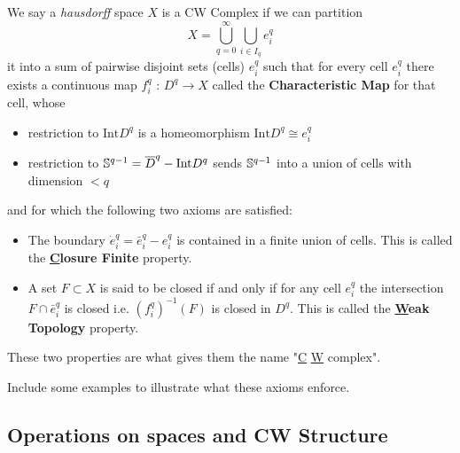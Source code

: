 \documentclass[11pt]{article}
\begin{document}
\begin{bluebox}
  
\begin{definition}
  We say a \textit{hausdorff} space $X$ is a CW Complex if we can partition $$ X = \bigcup_{q = 0}^{\infty} \bigcup_{i \in {I_q}} e_i^q $$ it into a sum of pairwise disjoint sets (cells) $e_i^q$ such that for every cell $e_i^q$ there exists a continuous map $f_i^q \text{ : } D^q \rightarrow X$ called the \textbf{Characteristic Map} for that cell, whose 
  \begin{itemize}
    \item restriction to $\mathrm{Int} D^q$ is a homeomorphism $\mathrm{Int} D^q \cong e_i^q$
    \item restriction to $\mathbb{S}^{q-1} = \overline{D}^q - \mathrm{Int} D^q$ sends $\mathbb{S}^{q-1}$ into a union of cells with dimension $< q$ 
  \end{itemize}
  and for which the following two axioms are satisfied: 
  \begin{itemize}
    \item The boundary $\dot{e}_i^q = \bar{e}_i^q - e_i^q$ is contained in a finite union of cells. This is called the \textbf{\underline{C}losure Finite} property.
    \item A set $F \subset X$ is said to be closed if and only if for any cell $e_i^q$ the intersection $F \cap \bar{e}_i^q$ is closed i.e. $\left(f_i^q\right)^{-1}(F)$ is closed in $D^q$. This is called the \textbf{\underline{W}eak Topology} property.
  \end{itemize}
\end{definition}
\end{bluebox}

\begin{dottedbox}
  These two properties are what gives them the name "\underline{C} \underline{W} complex".
\end{dottedbox}

\begin{note}
  {Include some examples to illustrate what these axioms enforce.}
\end{note}


\vskip 0.5cm
\subsection{Operations on spaces and CW Structure}
\end{document}
